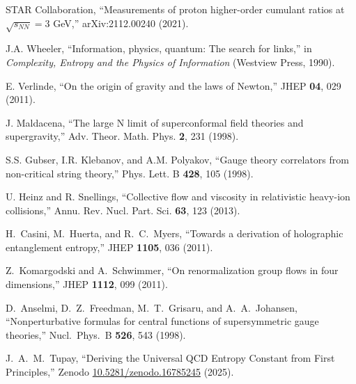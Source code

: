 \documentclass[12pt,a4paper]{article}
\begin{document}
\begin{thebibliography}{99}
STAR Collaboration, ``Measurements of proton higher-order cumulant ratios at $\sqrt{s_{NN}} = 3$ GeV,'' arXiv:2112.00240 (2021).

J.A. Wheeler, ``Information, physics, quantum: The search for links,'' in \textit{Complexity, Entropy and the Physics of Information} (Westview Press, 1990).

E. Verlinde, ``On the origin of gravity and the laws of Newton,'' JHEP \textbf{04}, 029 (2011).

J. Maldacena, ``The large N limit of superconformal field theories and supergravity,'' Adv. Theor. Math. Phys. \textbf{2}, 231 (1998).

S.S. Gubser, I.R. Klebanov, and A.M. Polyakov, ``Gauge theory correlators from non-critical string theory,'' Phys. Lett. B \textbf{428}, 105 (1998).

U. Heinz and R. Snellings, ``Collective flow and viscosity in relativistic heavy-ion collisions,'' Annu. Rev. Nucl. Part. Sci. \textbf{63}, 123 (2013).

H.~Casini, M.~Huerta, and R.~C.~Myers, ``Towards a derivation of holographic entanglement entropy,''
JHEP \textbf{1105}, 036 (2011).

Z.~Komargodski and A.~Schwimmer, ``On renormalization group flows in four dimensions,''
JHEP \textbf{1112}, 099 (2011).

D.~Anselmi, D.~Z.~Freedman, M.~T.~Grisaru, and A.~A.~Johansen, ``Nonperturbative formulas for central functions of supersymmetric gauge theories,''
Nucl.\ Phys.\ B \textbf{526}, 543 (1998).

J.~A.~M.~Tupay, ``Deriving the Universal QCD Entropy Constant from First Principles,'' Zenodo \href{https://doi.org/10.5281/zenodo.16785245}{10.5281/zenodo.16785245} (2025).


\end{thebibliography}
\end{document}
